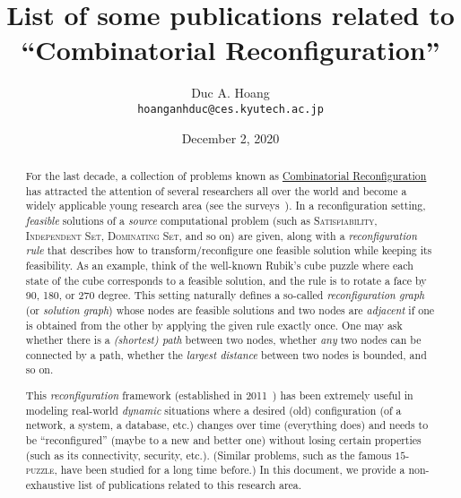 \documentclass[a4paper]{article}
\title{List of some publications related to ``Combinatorial Reconfiguration''}
\author{Duc A. Hoang\\ \texttt{hoanganhduc@ces.kyutech.ac.jp}}
\date{December 2, 2020}
\begin{document}
	\nocite{*}
	
	\maketitle
	
	\begin{abstract}
		For the last decade, a collection of problems known as \href{http://www.ecei.tohoku.ac.jp/alg/core}{Combinatorial Reconfiguration} has attracted the attention of several researchers all over the world and become a widely applicable young research area (see the surveys~\cite{books/cu/p/Heuvel13,journals/algorithms/Nishimura18,conf/seiccgtc/MynhardtN19}).
		In a reconfiguration setting, \textit{feasible} solutions of a \textit{source} computational problem (such as \textsc{Satisfiability}, \textsc{Independent Set}, \textsc{Dominating Set}, and so on) are given, along with a \textit{reconfiguration rule} that describes how to transform/reconfigure one feasible solution while keeping its feasibility.
		As an example, think of the well-known Rubik's cube puzzle where each state of the cube corresponds to a feasible solution, and the rule is to rotate a face by 90, 180, or 270 degree.
		This setting naturally defines a so-called \textit{reconfiguration graph} (or \textit{solution graph}) whose nodes are feasible solutions and two nodes are \textit{adjacent} if one is obtained from the other by applying the given rule exactly once.
		One may ask whether there is a \textit{(shortest) path} between two nodes, whether \textit{any} two nodes can be connected by a path, whether the \textit{largest distance} between two nodes is bounded, and so on.
		
		This \textit{reconfiguration} framework (established in 2011~\cite{journals/tcs/ItoDHPSUU11}) has been extremely useful in modeling real-world \textit{dynamic} situations where a desired (old) configuration (of a network, a system, a database, etc.) changes over time (everything does) and needs to be ``reconfigured'' (maybe to a new and better one) without losing certain properties (such as its connectivity, security, etc.).
		(Similar problems, such as the famous \textsc{$15$-puzzle}, have been studied for a long time before.)
		In this document, we provide a non-exhaustive list of publications related to this research area.
	\end{abstract}
	
	\clearpage
	
	\tableofcontents
	
	\clearpage
	
 	\printbibbyyear
\end{document}
